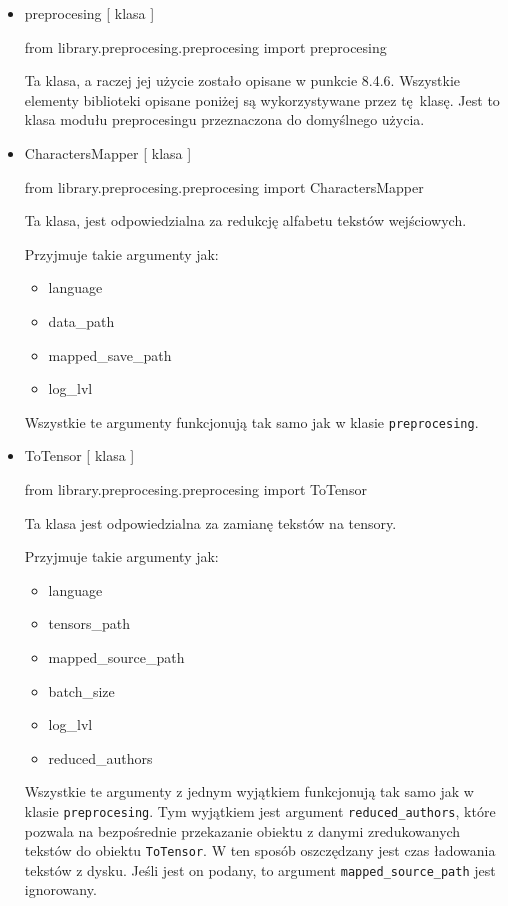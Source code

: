 \begin{itemize}
	
\item  {preprocesing [ klasa ] }
\begin{import}
from library.preprocesing.preprocesing import preprocesing
\end{import}

Ta klasa, a raczej jej użycie zostało opisane w punkcie 8.4.6. Wszystkie elementy biblioteki opisane
poniżej są wykorzystywane przez tę klasę. Jest to klasa modułu preprocesingu przeznaczona
do domyślnego użycia.

\item  {CharactersMapper [ klasa ] }
\begin{import}
from library.preprocesing.preprocesing import CharactersMapper
\end{import}
Ta klasa, jest odpowiedzialna za redukcję alfabetu tekstów wejściowych. 

Przyjmuje takie argumenty jak: 

\begin{itemize}
	\item language
	\item data\_path
	\item mapped\_save\_path
	\item log\_lvl
\end{itemize}

Wszystkie te argumenty funkcjonują tak samo jak w klasie \texttt{preprocesing}.


\item  {ToTensor [ klasa ] }
\begin{import}
from library.preprocesing.preprocesing import ToTensor
\end{import}
Ta klasa jest odpowiedzialna za zamianę tekstów na tensory.

Przyjmuje takie argumenty jak: 

\begin{itemize}
	\item language
	\item tensors\_path
	\item mapped\_source\_path
	\item batch\_size
	\item log\_lvl
	\item reduced\_authors
\end{itemize}

Wszystkie te argumenty z jednym wyjątkiem funkcjonują tak samo jak w klasie  \texttt{preprocesing}. 
Tym wyjątkiem jest argument \texttt{reduced\_authors}, które pozwala na bezpośrednie przekazanie obiektu z danymi 
zredukowanych tekstów do obiektu  \texttt{ToTensor}. W ten sposób oszczędzany jest czas ładowania tekstów z 
dysku. Jeśli jest on podany, to argument \texttt{mapped\_source\_path} jest ignorowany.

\end{itemize}

